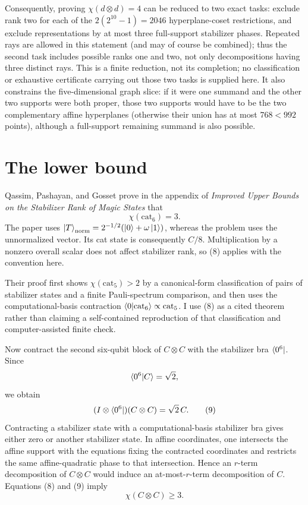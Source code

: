 \documentclass[11pt]{article}
\theoremstyle{definition}
\newcommand{\cat}{\mathrm{cat}}
\begin{document}
Consequently, proving $\chi(d\otimes d)=4$ can be reduced to two exact tasks: exclude rank two for each of the $2(2^{10}-1)=2046$ hyperplane-coset restrictions, and exclude representations by at most three full-support stabilizer phases. Repeated rays are allowed in this statement (and may of course be combined); thus the second task includes possible ranks one and two, not only decompositions having three distinct rays. This is a finite reduction, not its completion; no classification or exhaustive certificate carrying out those two tasks is supplied here. It also constrains the five-dimensional graph slice: if it were one summand and the other two supports were both proper, those two supports would have to be the two complementary affine hyperplanes (otherwise their union has at most $768<992$ points), although a full-support remaining summand is also possible.

\section{The lower bound}

Qassim, Pashayan, and Gosset prove in the appendix of \emph{Improved Upper Bounds on the Stabilizer Rank of Magic States} that
\begin{equation}
\chi(\cat_6)=3.
\tag{8}
\end{equation}
The paper uses $\ket{T}_{\mathrm{norm}}=2^{-1/2}(\ket{0}+\omega\ket{1})$, whereas the problem uses the unnormalized vector. Its cat state is consequently $C/8$. Multiplication by a nonzero overall scalar does not affect stabilizer rank, so (8) applies with the convention here.

Their proof first shows $\chi(\cat_5)>2$ by a canonical-form classification of pairs of stabilizer states and a finite Pauli-spectrum comparison, and then uses the computational-basis contraction $\braket{0|\cat_6}\propto\cat_5$. I use (8) as a cited theorem rather than claiming a self-contained reproduction of that classification and computer-assisted finite check.

Now contract the second six-qubit block of $C\otimes C$ with the stabilizer bra $\bra{0^6}$. Since
\[
\braket{0^6|C}=\sqrt2,
\]
we obtain
\begin{equation}
(I\otimes\bra{0^6})(C\otimes C)=\sqrt2\,C.
\tag{9}
\end{equation}
Contracting a stabilizer state with a computational-basis stabilizer bra gives either zero or another stabilizer state. In affine coordinates, one intersects the affine support with the equations fixing the contracted coordinates and restricts the same affine-quadratic phase to that intersection. Hence an $r$-term decomposition of $C\otimes C$ would induce an at-most-$r$-term decomposition of $C$. Equations (8) and (9) imply
\[
\chi(C\otimes C)\geq3.
\]
\end{document}
